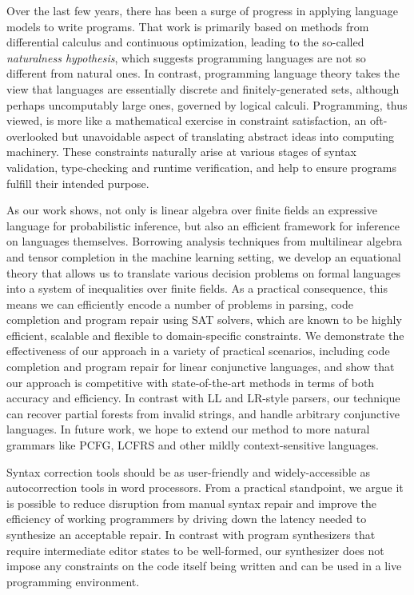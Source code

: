\documentclass[sigplan,review,anonymous,acmsmall]{acmart}\settopmatter{printfolios=false,printccs=false,printacmref=false}
\begin{document}
Over the last few years, there has been a surge of progress in applying language models to write programs. That work is primarily based on methods from differential calculus and continuous optimization, leading to the so-called \textit{naturalness hypothesis}, which suggests programming languages are not so different from natural ones. In contrast, programming language theory takes the view that languages are essentially discrete and finitely-generated sets, although perhaps uncomputably large ones, governed by logical calculi. Programming, thus viewed, is more like a mathematical exercise in constraint satisfaction, an oft-overlooked but unavoidable aspect of translating abstract ideas into computing machinery. These constraints naturally arise at various stages of syntax validation, type-checking and runtime verification, and help to ensure programs fulfill their intended purpose.

As our work shows, not only is linear algebra over finite fields an expressive language for probabilistic inference, but also an efficient framework for inference on languages themselves. Borrowing analysis techniques from multilinear algebra and tensor completion in the machine learning setting, we develop an equational theory that allows us to translate various decision problems on formal languages into a system of inequalities over finite fields. As a practical consequence, this means we can efficiently encode a number of problems in parsing, code completion and program repair using SAT solvers, which are known to be highly efficient, scalable and flexible to domain-specific constraints. We demonstrate the effectiveness of our approach in a variety of practical scenarios, including code completion and program repair for linear conjunctive languages, and show that our approach is competitive with state-of-the-art methods in terms of both accuracy and efficiency. In contrast with LL and LR-style parsers, our technique can recover partial forests from invalid strings, and handle arbitrary conjunctive languages. In future work, we hope to extend our method to more natural grammars like PCFG, LCFRS and other mildly context-sensitive languages.

Syntax correction tools should be as user-friendly and widely-accessible as autocorrection tools in word processors. From a practical standpoint, we argue it is possible to reduce disruption from manual syntax repair and improve the efficiency of working programmers by driving down the latency needed to synthesize an acceptable repair. In contrast with program synthesizers that require intermediate editor states to be well-formed, our synthesizer does not impose any constraints on the code itself being written and can be used in a live programming environment.
\end{document}
